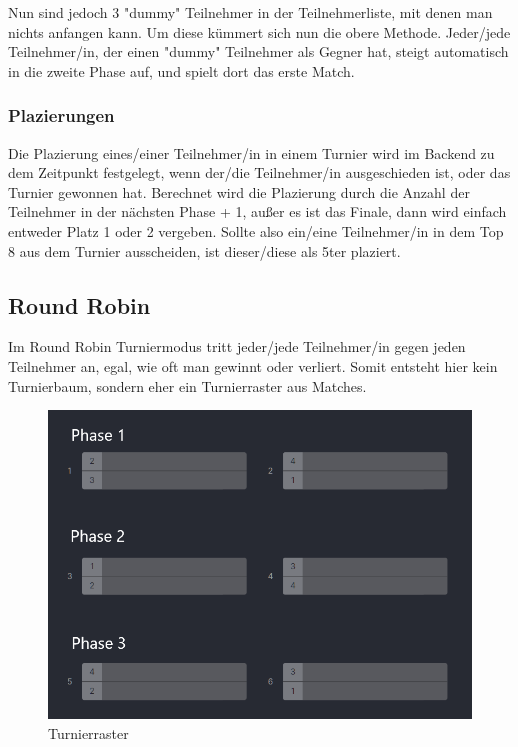 Nun sind jedoch 3 "dummy" Teilnehmer in der Teilnehmerliste, mit denen man nichts anfangen kann. Um diese kümmert sich nun die obere Methode. Jeder/jede Teilnehmer/in, der einen "dummy" Teilnehmer als Gegner hat, 
steigt automatisch in die zweite Phase auf, und spielt dort das erste Match.

\subsubsection{Plazierungen}

Die Plazierung eines/einer Teilnehmer/in in einem Turnier wird im Backend zu dem Zeitpunkt festgelegt, wenn der/die Teilnehmer/in ausgeschieden ist, oder 
das Turnier gewonnen hat. Berechnet wird die Plazierung durch die Anzahl der Teilnehmer in der nächsten Phase + 1, außer es ist das Finale, dann wird einfach entweder Platz 1 oder 2 vergeben. 
Sollte also ein/eine Teilnehmer/in in dem Top 8 aus dem Turnier ausscheiden, ist dieser/diese als 5ter plaziert.

\subsection{Round Robin}

Im Round Robin Turniermodus tritt jeder/jede Teilnehmer/in gegen jeden Teilnehmer an, egal, wie oft man gewinnt oder verliert. Somit entsteht hier kein Turnierbaum, sondern eher ein Turnierraster aus Matches.

\begin{figure}[H]
    \includegraphics[scale=0.5]{pics/backend/roundrobin/roundrobin_grid.png}
    \caption{Turnierraster\cite{implementation-execution-1}}
\end{figure}

